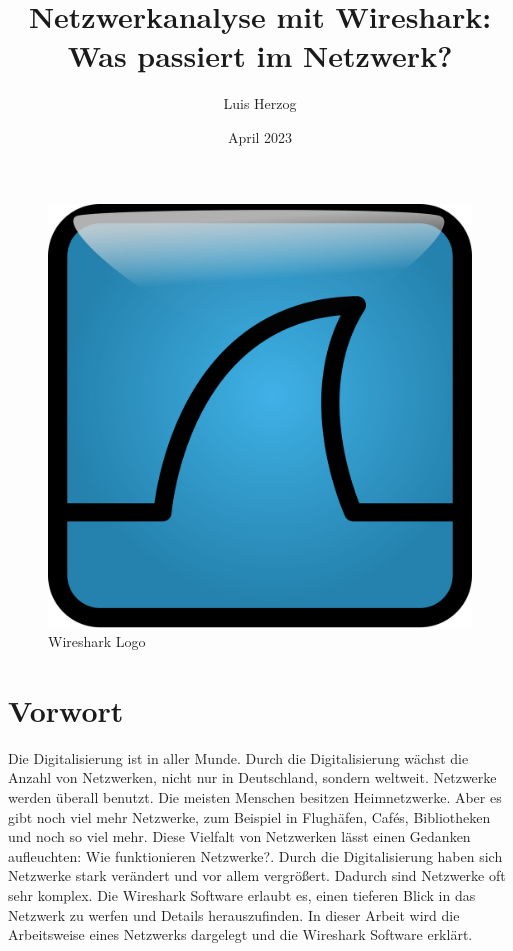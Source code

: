 \documentclass[12pt]{article}
\title{Netzwerkanalyse mit Wireshark: Was passiert im Netzwerk?}
\author{Luis Herzog}
\date{April 2023}
\begin{document}

\maketitle

\begin{figure}[h]
	\centering
	\includegraphics[scale=0.1]{Bilder/Wireshark_icon.svg.png}
	\caption{Wireshark Logo \cite{wireshark-logo}}
	\label{fig:figure1}
\end{figure}

\thispagestyle{empty}
\newpage
\tableofcontents
\thispagestyle{empty}
\newpage

\section{Vorwort}
Die Digitalisierung ist in aller Munde. Durch die Digitalisierung wächst die Anzahl von Netzwerken, nicht nur in Deutschland, sondern weltweit. Netzwerke werden überall benutzt. Die meisten Menschen besitzen Heimnetzwerke. Aber es gibt noch viel mehr Netzwerke, zum Beispiel in Flughäfen, Cafés, Bibliotheken und noch so viel mehr. Diese Vielfalt von Netzwerken lässt einen Gedanken aufleuchten: \glqq Wie funktionieren Netzwerke?\grqq. 
Durch die Digitalisierung haben sich Netzwerke stark verändert und vor allem vergrößert. Dadurch sind Netzwerke oft sehr komplex. Die Wireshark Software erlaubt es, einen tieferen Blick in das Netzwerk zu werfen und Details herauszufinden. In dieser Arbeit wird die Arbeitsweise eines Netzwerks dargelegt und die Wireshark Software erklärt. 
\end{document}
